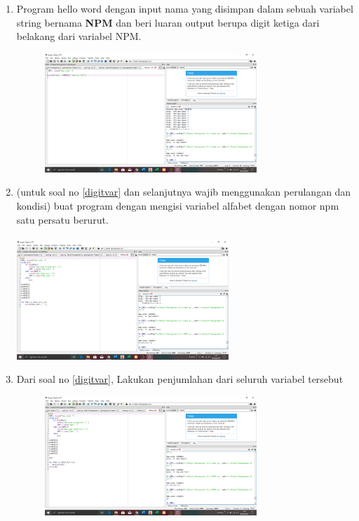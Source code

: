 \documentclass{article}
\begin{document}
\begin{enumerate}
\item
Program hello word dengan input nama yang disimpan dalam sebuah variabel string bernama \textbf{NPM} dan beri luaran output berupa digit ketiga dari belakang dari variabel NPM.
\begin{figure}[h]
\centerline{\includegraphics[width=8cm]{figures/npm4.png}}
\end{figure}


\item
\label{digitvar}
(untuk soal no \ref{digitvar} dan selanjutnya wajib menggunakan perulangan dan kondisi) buat program dengan mengisi variabel alfabet dengan nomor npm satu persatu berurut.
\paragraph{}
\centerline{\includegraphics[width=8cm]{figures/npm5.png}}


\item
Dari soal no \ref{digitvar}, Lakukan penjumlahan dari seluruh variabel tersebut
\begin{figure}[h]
\centerline{\includegraphics[width=8cm]{figures/npm6.png}}
\end{figure}



\end{enumerate}
\end{document}
